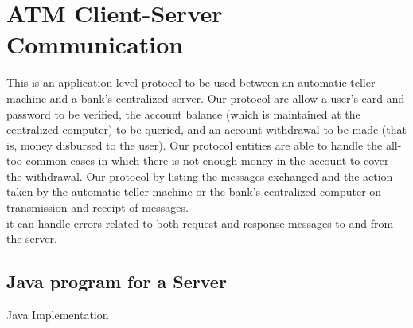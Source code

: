 \documentclass[11pt]{article}
\begin{document}
\section{ATM Client-Server Communication}
This is an application-level protocol to be used between an
automatic teller machine and a bank’s centralized server. Our protocol are
allow a user’s card and password to be verified, the account balance (which is
maintained at the centralized computer) to be queried, and an account
withdrawal to be made (that is, money disbursed to the user). Our protocol
entities are able to handle the all-too-common cases in which there is not
enough money in the account to cover the withdrawal. Our protocol by
listing the messages exchanged and the action taken by the automatic teller
machine or the bank’s centralized computer on transmission and receipt of
messages.\\[12pt]
it can handle errors related
to both request and response messages to and from the server.

\subsection{Java program for a Server }
Java Implementation \\[2pt]
\end{document}
